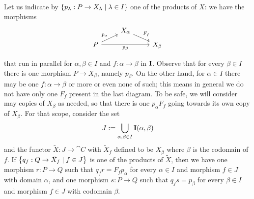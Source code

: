 Let us indicate by \(\left\{p_\lambda : P \to X_\lambda \mid \lambda \in I\right\}\) one of the products of \(X\): we have the morphisms
\[\begin{tikzcd}[row sep=tiny]
& X_\alpha \ar["{F_f}", dr] \\
P \ar["{p_\alpha}", ur] \ar["{p_\beta}", rr, swap] & & X_\beta \\ %
\end{tikzcd}\]
that run in parallel for \(\alpha, \beta \in I\) and \(f : \alpha \to \beta\) in \({\bf I}\). Observe that for every \(\beta \in I\) there is one morphism \(P \to X_\beta\), namely \(p_\beta\). On the other hand, for \(\alpha \in I\) there may be one \(f : \alpha \to \beta\) or more or even none of such; this means in general we do not have only one \(F_f\) present in the last diagram. To be safe, we will consider may copies of \(X_\beta\) as needed, so that there is one \(p_\alpha F_f\) going towards its own copy of \(X_\beta\).  For that scope, consider the set \[J := \bigcup_{\alpha, \beta \in I} {\bf I}(\alpha, \beta)\]
and the functor \(\tilde X : J \to \cat C\) with \(\tilde X_f\) defined to be \(X_\beta\) where \(\beta\) is the codomain of \(f\). If \(\left\{q_f : Q \to \tilde X_f \mid f \in J\right\}\) is one of the products of \(\tilde X\), then we have one morphism \(r : P \to Q\) such that \(q_f r = F_f p_\alpha\) for every \(\alpha \in I\) and morphism \(f \in J\) with domain \(\alpha\), and one morphism \(s : P 	\to Q\) such that \(q_f s = p_\beta\) for every \(\beta \in I\) and morphism \(f \in J\) with codomain \(\beta\).

